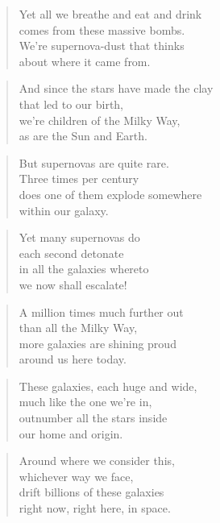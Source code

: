 \documentclass[14pt,a4paper]{article}
\begin{document}
\begin{verse}
Yet all we breathe and eat and drink\\
comes from these massive bombs.\\
We’re supernova-dust that thinks\\
about where it came from.
\end{verse}

\begin{verse}
And since the stars have made the clay\\
that led to our birth,\\
we’re children of the Milky Way,\\
as are the Sun and Earth.
\end{verse}

\begin{verse}
But supernovas are quite rare.\\
Three times per century\\
does one of them explode somewhere\\
within our galaxy.
\end{verse}

\begin{verse}
Yet many supernovas do\\
each second detonate\\
in all the galaxies whereto\\
we now shall escalate!
\end{verse}

\begin{verse}
A million times much further out\\
than all the Milky Way,\\
more galaxies are shining proud\\
around us here today.
\end{verse}

\begin{verse}
These galaxies, each huge and wide,\\
much like the one we’re in,\\
outnumber all the stars inside\\
our home and origin.
\end{verse}

\begin{verse}
Around where we consider this,\\
whichever way we face,\\
drift billions of these galaxies\\
right now, right here, in space.
\end{verse}
\end{document}
